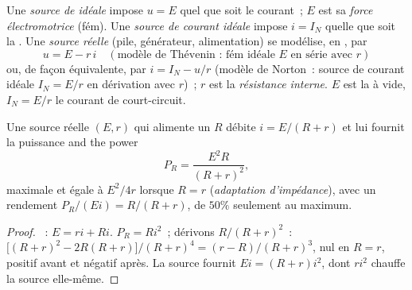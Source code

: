 \begin{definition}\label{def:b1:dc-circuits:sources}
Une \emph{source de  idéale} impose $u = E$ quel que soit le
courant~; $E$ est sa \emph{force électromotrice} (fém). Une \emph{source
de courant idéale} impose $i = I_N$ quelle que soit la . Une
\emph{source réelle} (pile, générateur, alimentation) se modélise, en
, par
\[
u = E - r\,i \quad (\text{modèle de Thévenin~: fém idéale } E \text{ en série avec } r)
\]
ou, de façon équivalente, par $i = I_N - u/r$ (modèle de Norton~: source
de courant idéale $I_N = E/r$ en dérivation avec $r$)~; $r$ est la
\emph{résistance interne}. $E$ est la  à vide, $I_N = E/r$ le
courant de court-circuit.
\end{definition}

\begin{proposition}\label{prop:b1:dc-circuits:sourcepower}
Une source réelle $(E, r)$ qui alimente un  $R$ débite
$i = E/(R + r)$ et lui fournit la puissance
and the power
\[
P_R = \frac{E^2 R}{(R + r)^2},
\]
maximale et égale à $E^2/4r$ lorsque $R = r$ (\emph{adaptation
d'impédance}), avec un rendement $P_R/(Ei) = R/(R + r)$, de $50\%$
seulement au maximum.
\end{proposition}

\begin{proof}
~: $E = ri + Ri$. $P_R = Ri^2$~; dérivons $R/(R + r)^2$~:
$\big[(R + r)^2 - 2R(R + r)\big]/(R + r)^4 = (r - R)/(R + r)^3$, nul en
$R = r$, positif avant et négatif après. La source fournit
$Ei = (R + r)i^2$, dont $ri^2$ chauffe la source elle-même.
\end{proof}

